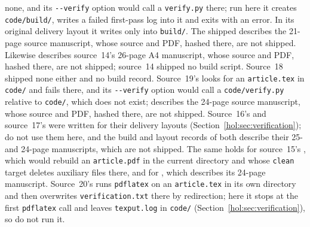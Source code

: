 \documentclass[11pt]{article}
\numberwithin{equation}{section}
\theoremstyle{definition}
\theoremstyle{remark}
\begin{document}
none, and its \verb|--verify| option would call a \texttt{verify.py} there; run
here it creates \texttt{code/build/}, writes a failed first-pass log into it
and exits with an error. In its original delivery layout it writes only into
\texttt{build/}. The shipped 
describes the 21-page source manuscript, whose source and PDF, hashed there,
are not shipped. Likewise 
describes source~14's 26-page A4 manuscript, whose source and PDF, hashed
there, are not shipped; source~14 shipped no build script. Source~18 shipped
none either and no build record. Source~19's
 looks for an \texttt{article.tex}
in \texttt{code/} and fails there, and its \verb|--verify| option would call
a \texttt{code/verify.py} relative to \texttt{code/}, which does not exist;
 describes the 24-page source
manuscript, whose source and PDF, hashed there, are not shipped. Source~16's
 and source~17's
 were written for their delivery layouts
(Section~\ref{hol:sec:verification}); do not use them here, and the build and
layout records of both describe their 25- and 24-page manuscripts, which are
not shipped. The same holds for source~15's
, which would rebuild an
\texttt{article.pdf} in the current directory and whose \texttt{clean} target
deletes auxiliary files there, and for
, which describes its
24-page manuscript. Source~20's  runs
\texttt{pdflatex} on an \texttt{article.tex} in its own directory and then
overwrites \texttt{verification.txt} there by redirection; here it stops at the
first \texttt{pdflatex} call and leaves \texttt{texput.log} in \texttt{code/}
(Section~\ref{hol:sec:verification}), so do not run it.
\end{document}

